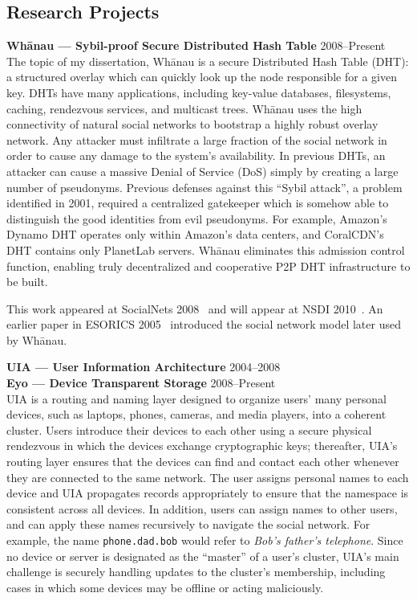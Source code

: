 \documentclass[margin,line,11pt]{resume}
\let\oldsection=\section
\renewcommand{\section}[1]{\oldsection{\small\sc #1}}
\def\Whanau{Wh\=a\-nau\xspace}
\begin{document}
\begin{resume}
\newpage

\section{Research Projects}

\textbf{\Whanau{} --- Sybil-proof Secure Distributed Hash Table}
\hfill 2008--Present\\
The topic of my dissertation, \Whanau is a secure
Distributed Hash Table (DHT): a structured overlay which can quickly look up
the node responsible for a given key.  DHTs have many applications, including
key-value databases, filesystems, caching, rendezvous services, and multicast
trees.  \Whanau uses the high connectivity of natural social networks
to bootstrap a highly robust overlay network.  Any attacker must infiltrate a
large fraction of the social network in order to cause any damage to the
system's availability.  In previous DHTs, an attacker can cause a massive
Denial of Service (DoS) simply by creating a large number of pseudonyms.
Previous defenses against this ``Sybil attack'', a problem identified in 2001,
required a centralized gatekeeper which is somehow able to distinguish the good
identities from evil pseudonyms.  For example, Amazon's Dynamo DHT operates
only within Amazon's data centers, and CoralCDN's DHT contains only PlanetLab
servers.  \Whanau eliminates this admission control function, enabling truly
decentralized and cooperative P2P DHT infrastructure to be built.

This work appeared at SocialNets 2008~\cite{sybil:socialnets08}
and will appear at NSDI 2010~\cite{whanau:nsdi10}.
An earlier paper in ESORICS 2005~\cite{sybil:esorics05} introduced the social
network model later used by \Whanau.

\textbf{UIA --- User Information Architecture}
\hfill 2004--2008\\
\textbf{Eyo --- Device Transparent Storage}
\hfill 2008--Present\\
UIA is a routing and naming layer designed to organize users' many
personal devices, such as laptops, phones, cameras, and media players, into a
coherent cluster.  Users introduce their devices to each other using a secure
physical rendezvous in which the devices exchange cryptographic keys;
thereafter, UIA's routing layer ensures that the devices can find and contact
each other whenever they are connected to the same network.  The user assigns
personal names to each device and UIA propagates records appropriately to
ensure that the namespace is consistent across all devices.  In addition, users
can assign names to other users, and can apply these names recursively to
navigate the social network.  For example, the name \texttt{phone.dad.bob}
would refer to \emph{Bob's father's telephone}.  Since no device or server is
designated as the ``master'' of a user's cluster, UIA's main challenge is
securely handling updates to the cluster's membership, including cases in which
some devices may be offline or acting maliciously.


\end{resume}
\end{document}
